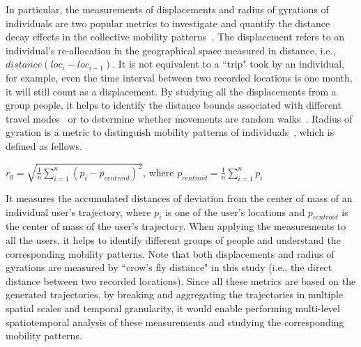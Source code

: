 \documentclass[a4paper, 11pt]{article}
\begin{document}
In particular, the measurements of displacements and radius of gyrations of individuals are two popular metrics to investigate and quantify the distance decay effects in the collective mobility patterns~\citep{gonzalez2008understanding}.
The displacement refers to an individual's re-allocation in the geographical space measured in distance, i.e., $distance (loc_{i} - loc_{i-1})$. It is not equivalent to a ``trip" took by an individual, for example, even the time interval between two recorded locations is one month, it will still count as a displacement.  
By studying all the displacements from a group people, it helps to identify the distance bounds associated with different travel modes~\citep{Jurdak2015} or to determine whether movements are random walks~\citep{brockmann2006scaling}.
Radius of gyration is a metric to distinguish mobility patterns of individuals~\citep{gonzalez2008understanding}, which is defined as fellows.   
\newline

$r_{g} = \sqrt{\frac{1}{n}\sum_{i=1}^{n}(p_{i} -  p_{centroid})^{2}}$, where $p_{centroid} = \frac{1}{n}\sum_{i=1}^{n}p_{i}$
\newline

\noindent It measures the accumulated distances of deviation from the center of mass of an individual user's trajectory, where $p_{i}$ is one of the user's locations and $p_{centroid}$ is the center of mass of the user's trajectory. When applying the measurements to all the users, it helps to identify different groups of people and understand the corresponding mobility patterns. Note that both displacements and radius of gyrations are measured by ``crow's fly distance" in this study (i.e., the direct distance between two recorded locations).
Since all these metrics are based on the generated trajectories, by breaking and aggregating the trajectories in multiple spatial scales and temporal granularity, it would enable performing multi-level spatiotemporal analysis of these measurements and studying the corresponding mobility patterns. 
\end{document}
